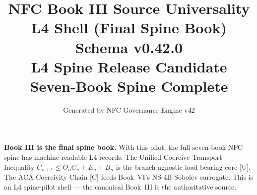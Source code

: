 \documentclass[11pt]{article}
\title{NFC Book III Source Universality L4 Shell (Final Spine Book)\\[1ex]\large Schema v0.42.0\\[0.5ex]
\normalsize L4 Spine Release Candidate\\[0.5ex]
\small Seven-Book Spine Complete}
\author{Generated by NFC Governance Engine v42}
\date{}
\begin{document}
\maketitle
\tableofcontents
\bigskip
\noindent\textbf{Book III is the final spine book.} With this pilot, the full
seven-book NFC spine has machine-readable L4 records.
The Unified Coercive-Transport Inequality $C_{n+1} \leq \Theta_n C_n + E_n + B_n$
is the branch-agnostic load-bearing core [U].
The ACA Coercivity Chain [C] feeds Book~VI's NS-4B Sobolev surrogate.
This is an L4 spine-pilot shell --- the canonical Book~III is the authoritative source.
\vspace{1em}

\end{document}
